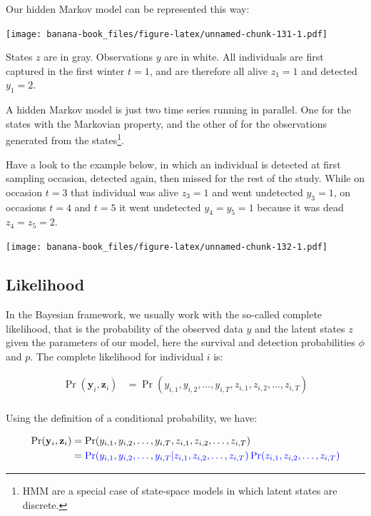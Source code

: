 \documentclass[
  12pt,
]{krantz}
\makeatletter
\newenvironment{kframe}{%
\medskip{}
\setlength{\fboxsep}{.8em}
 \def\at@end@of@kframe{}%
 \ifinner\ifhmode%
  \def\at@end@of@kframe{\end{minipage}}%
  \begin{minipage}{\columnwidth}%
 \fi\fi%
 \def\FrameCommand##1{\hskip\@totalleftmargin \hskip-\fboxsep
 \colorbox{shadecolor}{##1}\hskip-\fboxsep
     \hskip-\linewidth \hskip-\@totalleftmargin \hskip\columnwidth}%
 \MakeFramed {\advance\hsize-\width
   \@totalleftmargin\z@ \linewidth\hsize
   \@setminipage}}%
 {\par\unskip\endMakeFramed%
 \at@end@of@kframe}
\newenvironment{rmdblock}[1]
  {
  \begin{itemize}
  \renewcommand{\labelitemi}{
    \raisebox{-.7\height}[0pt][0pt]{
      {\setkeys{Gin}{width=3em,keepaspectratio}\texttt{[image: images/\#1]}}
    }
  }
  \setlength{\fboxsep}{1em}
  \begin{kframe}
  \item
  }
  {
  \end{kframe}
  \end{itemize}
  }
\newenvironment{rmdnote}
  {\begin{rmdblock}{note}}
  {\end{rmdblock}}
\makeatother
\begin{document}
Our hidden Markov model can be represented this way:

\texttt{[image: banana-book\_files/figure-latex/unnamed-chunk-131-1.pdf]}

States \(z\) are in gray. Observations \(y\) are in white. All individuals are first captured in the first winter \(t = 1\), and are therefore all alive \(z_1 = 1\) and detected \(y_1 = 2\).

\begin{rmdnote}
A hidden Markov model is just two time series running in parallel. One for the states with the Markovian property, and the other of for the observations generated from the states\footnote{HMM are a special case of state-space models in which latent states are discrete.}.
\end{rmdnote}

Have a look to the example below, in which an individual is detected at first sampling occasion, detected again, then missed for the rest of the study. While on occasion \(t=3\) that individual was alive \(z_3=1\) and went undetected \(y_3=1\), on occasions \(t=4\) and \(t=5\) it went undetected \(y_4=y_5=1\) because it was dead \(z_4=z_5=2\).

\texttt{[image: banana-book\_files/figure-latex/unnamed-chunk-132-1.pdf]}

\hypertarget{likelihoodhmm}{%
\subsection{Likelihood}\label{likelihoodhmm}}

In the Bayesian framework, we usually work with the so-called complete likelihood, that is the probability of the observed data \(y\) and the latent states \(z\) given the parameters of our model, here the survival and detection probabilities \(\phi\) and \(p\). The complete likelihood for individual \(i\) is:

\begin{align*}
\Pr(\mathbf{y}_i, \mathbf{z}_i) &= \Pr(y_{i,1}, y_{i,2}, \ldots, y_{i,T}, z_{i,1}, z_{i,2}, \ldots, z_{i,T})\\
\end{align*}

Using the definition of a conditional probability, we have:

\begin{align*}
\Pr(\mathbf{y}_i, \mathbf{z}_i) &= \Pr(y_{i,1}, y_{i,2}, \ldots, y_{i,T}, z_{i,1}, z_{i,2}, \ldots, z_{i,T})\\
                  &= \color{blue}{\Pr(y_{i,1}, y_{i,2}, \ldots, y_{i,T} | z_{i,1}, z_{i,2}, \ldots, z_{i,T}) \Pr(z_{i,1}, z_{i,2}, \ldots, z_{i,T})}\\
\end{align*}
\end{document}
